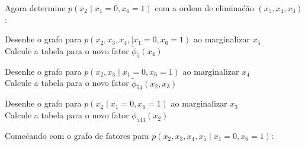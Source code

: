 \begin{exenumerate}
\begin{solution}
    \end{solution}
    
    \item Agora determine $p(x_2 \mid x_1=0, x_6=1)$ com a ordem de elimina\'c\~ao $(x_5, x_4, x_3)$:
    
    \begin{exenumerate}
        \item Desenhe o grafo para $p(x_2, x_3, x_4, \mid x_1=0, x_6=1)$ ao marginalizar $x_5$ \\
        Calcule a tabela para o novo fator $\tilde{\phi}_{5}(x_4)$ \\
        
        \item Desenhe o grafo para $p(x_2, x_3 \mid x_1=0, x_6=1)$ ao marginalizar $x_4$ \\
        Calcule a tabela para o novo fator $\tilde{\phi}_{54}(x_2, x_3)$ \\
        
        \item Desenhe o grafo para $p(x_2 \mid x_1=0, x_6=1)$ ao marginalizar $x_3$ \\
        Calcule a tabela para o novo fator $\tilde{\phi}_{543}(x_2)$ 
    \end{exenumerate}
    
    \begin{solution}
        
        Come\'cando com o grafo de fatores para $p(x_2, x_3, x_4, x_5 \mid x_1=0, x_6=1)$:
        
        \begin{center}
        \end{center}
        

\end{solution}
\end{exenumerate}
